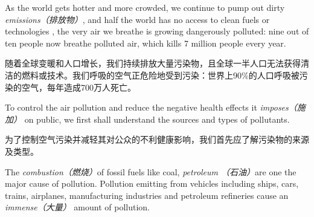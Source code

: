 
\begin{multicols}{3}


As the world gets hotter and more crowded, we continue to pump out dirty \textit{emissions（排放物）}, and half the world has no access to clean fuels or technologies , the very air we breathe is growing dangerously polluted: nine out of ten people now breathe polluted air, which kills 7 million people every year.

随着全球变暖和人口增长，我们持续排放大量污染物，且全球一半人口无法获得清洁的燃料或技术。我们呼吸的空气正危险地受到污染：世界上90\%的人口呼吸被污染的空气，每年造成700万人死亡。

To control the air pollution and reduce the negative health effects it \textit{imposes（施加）} on public, we first shall understand the sources and types of pollutants.

为了控制空气污染并减轻其对公众的不利健康影响，我们首先应了解污染物的来源及类型。

The \textit{combustion（燃烧）}of fossil fuels like coal, \textit{petroleum （石油）}are one the major cause of pollution. Pollution emitting from vehicles including ships, cars, trains, airplanes, manufacturing industries and petroleum refineries cause an \textit{immense（大量）} amount of pollution. 


\end{multicols}
